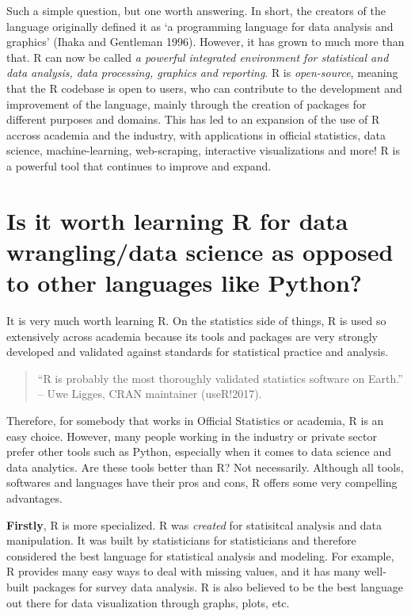 \documentclass[]{book}
\begin{document}
Such a simple question, but one worth answering. In short, the creators of the language originally defined it as `a programming language for data analysis and graphics' (Ihaka and Gentleman 1996). However, it has grown to much more than that. R can now be called \emph{a powerful integrated environment for statistical and data analysis, data processing, graphics and reporting}. R is \emph{open-source}, meaning that the R codebase is open to users, who can contribute to the development and improvement of the language, mainly through the creation of packages for different purposes and domains. This has led to an expansion of the use of R accross academia and the industry, with applications in official statistics, data science, machine-learning, web-scraping, interactive visualizations and more! R is a powerful tool that continues to improve and expand.

\hypertarget{is-it-worth-learning-r-for-data-wranglingdata-science-as-opposed-to-other-languages-like-python}{%
\section{Is it worth learning R for data wrangling/data science as opposed to other languages like Python?}\label{is-it-worth-learning-r-for-data-wranglingdata-science-as-opposed-to-other-languages-like-python}}

It is very much worth learning R. On the statistics side of things, R is used so extensively across academia because its tools and packages are very strongly developed and validated against standards for statistical practice and analysis.

\begin{quote}
``R is probably the most thoroughly validated statistics software on Earth.'' -- Uwe Ligges, CRAN maintainer (useR!2017).
\end{quote}

Therefore, for somebody that works in Official Statistics or academia, R is an easy choice. However, many people working in the industry or private sector prefer other tools such as Python, especially when it comes to data science and data analytics. Are these tools better than R? Not necessarily. Although all tools, softwares and languages have their pros and cons, R offers some very compelling advantages.

\textbf{Firstly}, R is more specialized. R was \emph{created} for statisitcal analysis and data manipulation. It was built by statisticians for statisticians and therefore considered the best language for statistical analysis and modeling. For example, R provides many easy ways to deal with missing values, and it has many well-built packages for survey data analysis. R is also believed to be the best language out there for data visualization through graphs, plots, etc.
\end{document}
